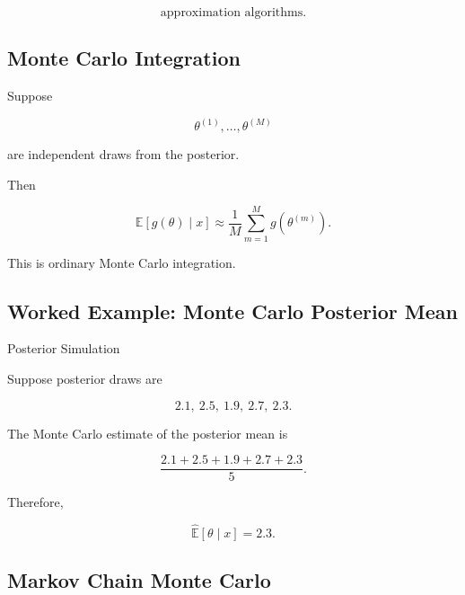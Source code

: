 \[
\boxed{
\text{approximation algorithms}.
}
\]

\subsection{Monte Carlo Integration}
\label{subsec:monte-carlo-integration-bayes}

Suppose

\[
\theta^{(1)},
\ldots,
\theta^{(M)}
\]

are independent draws from the posterior.

Then

\[
\boxed{
\mathbb{E}
[
g(\theta)
\mid x
]
\approx
\frac1M
\sum_{m=1}^{M}
g
(
\theta^{(m)}
).
}
\]

This is ordinary Monte Carlo integration.

\subsection{Worked Example: Monte Carlo Posterior Mean}
\label{subsec:worked-monte-carlo-posterior}

\begin{workedexamplebox}{Posterior Simulation}

Suppose posterior draws are

\[
2.1,\ 2.5,\ 1.9,\ 2.7,\ 2.3.
\]

The Monte Carlo estimate of the posterior mean is

\[
\frac{
2.1+2.5+1.9+2.7+2.3
}{5}.
\]

Therefore,

\begin{answerbox}
\[
\boxed{
\widehat{\mathbb{E}}
[
\theta\mid x
]
=
2.3.
}
\]
\end{answerbox}

\end{workedexamplebox}

\subsection{Markov Chain Monte Carlo}
\label{subsec:markov-chain-monte-carlo}


